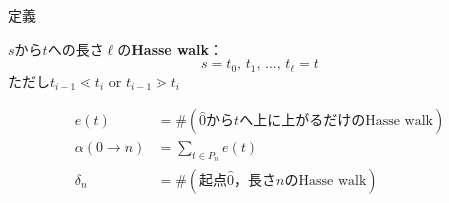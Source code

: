 \documentclass[aspectratio=98, 8pt, t]{beamer}
\theoremstyle{definition}
\begin{document}
\begin{frame}{定義}
  \begin{definition}
    $s$から$t$への長さ$\ell$の\textbf{Hasse walk}： \begin{equation*}
      s = t_0,\,t_1,\,\ldots,\,t_\ell = t
    \end{equation*}
    ただし$t_{i-1} \lessdot t_i$ or $t_{i-1} \gtrdot t_i$
  \end{definition}

  \pause
  \begin{definition}
    \begin{align*}
      e(t)            & = \#(\text{$\hat0$から$t$へ上に上がるだけのHasse walk}) \\
      \alpha(0 \to n) & = \sum_{t \in P_n} e(t)                      \\
      \delta_n        & = \#(\text{起点$\hat0$，長さ$n$のHasse walk})
    \end{align*}
  \end{definition}
\end{frame}
\end{document}
